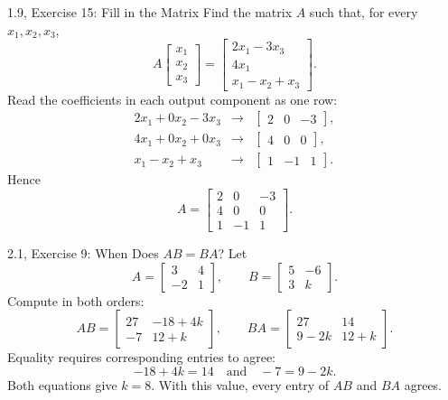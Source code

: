 \begin{frame}{1.9, Exercise 15: Fill in the Matrix}
Find the matrix $A$ such that, for every $x_1,x_2,x_3$,
\[
A\begin{bmatrix}x_1\\x_2\\x_3\end{bmatrix}
=\begin{bmatrix}2x_1-3x_3\\4x_1\\x_1-x_2+x_3\end{bmatrix}.
\]
\pause
Read the coefficients in each output component as one row:
\[
\begin{array}{ccl}
2x_1+0x_2-3x_3 &\longrightarrow& \begin{bmatrix}2&0&-3\end{bmatrix},\\
4x_1+0x_2+0x_3 &\longrightarrow& \begin{bmatrix}4&0&0\end{bmatrix},\\
x_1-x_2+x_3 &\longrightarrow& \begin{bmatrix}1&-1&1\end{bmatrix}.
\end{array}
\]
Hence
\[
\boxed{A=\begin{bmatrix}2&0&-3\\4&0&0\\1&-1&1\end{bmatrix}}.
\]
\end{frame}

\begin{frame}{2.1, Exercise 9: When Does $AB=BA$?}
Let
\[
A=\begin{bmatrix}3&4\\-2&1\end{bmatrix},
\qquad
B=\begin{bmatrix}5&-6\\3&k\end{bmatrix}.
\]
Compute in both orders:
\[
AB=\begin{bmatrix}27&-18+4k\\-7&12+k\end{bmatrix},
\qquad
BA=\begin{bmatrix}27&14\\9-2k&12+k\end{bmatrix}.
\]
\pause
Equality requires corresponding entries to agree:
\[
-18+4k=14
\quad\text{and}\quad
-7=9-2k.
\]
Both equations give $\boxed{k=8}$. With this value, every entry of $AB$ and $BA$ agrees.
\end{frame}

